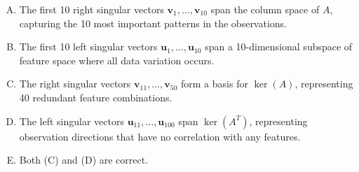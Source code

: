 \documentclass[12pt]{amsart}
\begin{document}
\begin{enumerate}[(A)]
\item The first 10 right singular vectors $\mathbf{v}_1, \ldots, \mathbf{v}_{10}$ span the column space of $A$, capturing the 10 most important patterns in the observations.
\item The first 10 left singular vectors $\mathbf{u}_1, \ldots, \mathbf{u}_{10}$ span a 10-dimensional subspace of feature space where all data variation occurs.
\item The right singular vectors $\mathbf{v}_{11}, \ldots, \mathbf{v}_{50}$ form a basis for $\ker(A)$, representing 40 redundant feature combinations.
\item The left singular vectors $\mathbf{u}_{11}, \ldots, \mathbf{u}_{100}$ span $\ker(A^T)$, representing observation directions that have no correlation with any features.
\item Both (C) and (D) are correct.
\end{enumerate}

\end{document}
